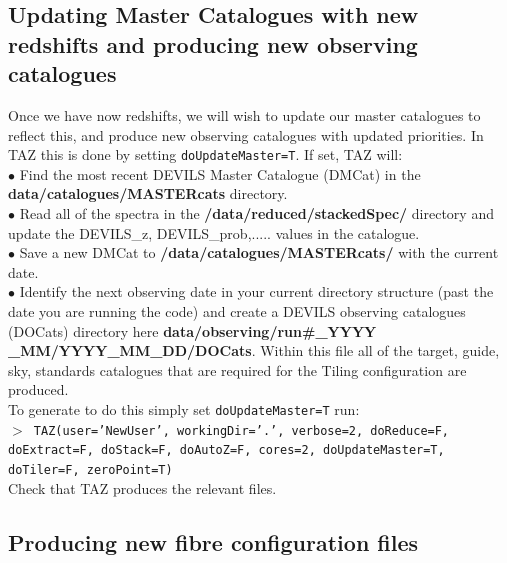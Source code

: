 \documentclass[12pt]{article}
\begin{document}
 \subsection{Updating Master Catalogues with new redshifts and producing new observing catalogues}

Once we have now redshifts, we will wish to update our master catalogues to reflect this, and produce new observing catalogues with updated priorities. In TAZ this is done by setting \texttt{doUpdateMaster=T}. If set, TAZ will:\\

$\bullet$ Find the most recent DEVILS Master Catalogue (DMCat) in the \textbf{data/catalogues/MASTERcats} directory.\\


$\bullet$ Read all of the spectra in the \textbf{/data/reduced/stackedSpec/} directory and update the DEVILS\_z,  DEVILS\_prob,..... values in the catalogue.\\

$\bullet$ Save a new DMCat to \textbf{/data/catalogues/MASTERcats/} with the current date. \\

$\bullet$ Identify the next observing date in your current directory structure (past the date you are running the code) and create a DEVILS observing catalogues (DOCats) directory here \textbf{data/observing/run\#\_YYYY \_MM/YYYY\_MM\_DD/DOCats}. Within this file all of the target, guide, sky, standards catalogues that are required for the Tiling configuration are produced.\\

To generate to do this simply set \texttt{doUpdateMaster=T} run:\\

  \hspace{10mm} \texttt{$>$ TAZ(user='NewUser', workingDir='.', verbose=2, doReduce=F, doExtract=F, doStack=F, doAutoZ=F,  cores=2, doUpdateMaster=T, doTiler=F, zeroPoint=T)}\\  
  
  Check that TAZ produces the relevant files. 


 \subsection{Producing new fibre configuration files}
 
\end{document}

